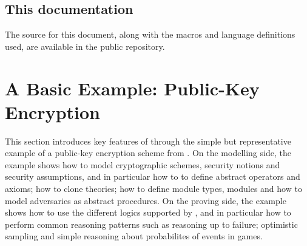 \subsection{This documentation}
The source for this document, along with the macros and language definitions
used, are available in the public repository.

\section{A Basic Example: Public-Key Encryption\label{sec:tutorial}}
This section introduces key features of \EasyCrypt through the simple
but representative example of a public-key encryption scheme from
\citet{br93}. On the modelling side, the example shows how to model
cryptographic schemes, security notions and security assumptions, and
in particular how to to define abstract operators and axioms; how to
clone theories; how to define module types, modules and how to model
adversaries as abstract procedures. On the proving side, the example
shows how to use the different logics supported by \EasyCrypt, and in
particular how to perform common reasoning patterns such as reasoning
up to failure; optimistic sampling and simple reasoning about
probabilites of events in games.




